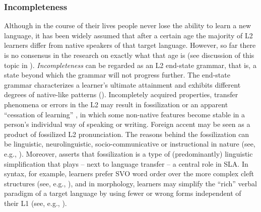 \subsubsection{Incompleteness}
Although in the course of their lives people never lose the ability to learn a new language, it has been widely assumed that after a certain age the majority of L2 learners differ from native speakers of that target language. However, so far there is no consensus in the research on exactly what that age is (see discussion of this topic in ). \textit{Incompleteness} can be regarded as an L2 end-state grammar, that is, a state beyond which the grammar will not progress further. The end-state grammar characterizes a learner’s ultimate attainment and exhibits different degrees of native-like patterns (\citealt[5]{ColantoniEtAl2015}). Incompletely acquired properties, transfer phenomena or errors in the L2 may result in fossilization or an apparent “cessation of learning” \citep[457]{Odlin2003}, in which some non-native features become stable in a person’s individual way of speaking or writing. Foreign accent may be seen as a product of fossilized L2 pronunciation. The reasons behind the fossilization can be linguistic, neurolinguistic, socio-communicative or instructional in nature (see, e.g., \citealt{Sims1989, HanOdlin2005}). Moreover, \citet{Selinker1993} asserts that fossilization is a type of (predominantly) linguistic simplification that plays -- next to language transfer -- a central role in SLA. In syntax, for example, learners prefer SVO word order over the more complex cleft structures (see, e.g., \citealt{Schachter1988}), and in morphology, learners may simplify the “rich” verbal paradigm of a target language by using fewer or wrong forms independent of their L1 (see, e.g., \citealt{Montrul2011}).



